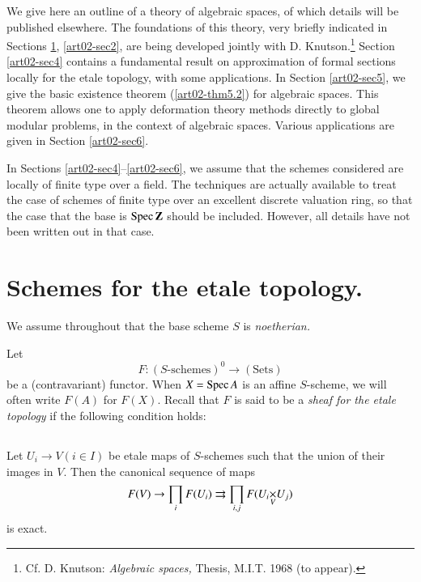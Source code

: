 We give here an outline of a theory of algebraic spaces, of which details will be published elsewhere. The foundations of this theory, very briefly indicated in Sections \ref{art02-sec1}, \ref{art02-sec2}, are being developed jointly with D. Knutson.\footnote{Cf. D. Knutson: {\em Algebraic spaces,} Thesis, M.I.T. 1968 (to appear).} Section \ref{art02-sec4} contains a fundamental result on approximation of formal sections locally for the etale topology, with some applications. In Section \ref{art02-sec5}, we give the basic existence theorem (\ref{art02-thm5.2}) for algebraic spaces. This theorem allows one to apply deformation theory methods directly to global modular problems, in the context of algebraic spaces. Various applications are given in Section \ref{art02-sec6}.

In Sections \ref{art02-sec4}--\ref{art02-sec6}, we assume that the schemes considered are locally of finite type over a field. The techniques are actually available to treat the case of schemes of finite type over an excellent discrete valuation ring, so that the case that the base is $\operatorname{Spec} \mathbf{Z}$ should be included. However, all details have not been written out in that case.\\[-.7cm]

\section{Schemes for the etale topology.}\label{art02-sec1}

We assume throughout that the base scheme $S$ is {\em noetherian.}

Let
\begin{equation*}
F:(S\text{-schemes})^{0}\to (\text{Sets})\tag{1.1}\label{art02-eq1.1}
\end{equation*}
be a (contravariant) functor. When $X=\operatorname{Spec} A$ is an affine $S$-scheme, we will often write $F(A)$ for $F(X)$. Recall that $F$ is said to be a {\em sheaf for the etale topology} if the following condition holds:

\setcounter{subsection}{1}
\subsection{}\label{art02-sec1.2}

Let $U_{i}\to V(i\in I)$ be etale maps of $S$-schemes such that the union of their images in $V$. Then the canonical sequence of maps 
$$
F(V)\to \prod\limits_{i} F(U_{i})\rightrightarrows \prod\limits_{i,j}F(\fprod{U_{i}}{U_{j}}{V})
$$\pageoriginale
is exact.

